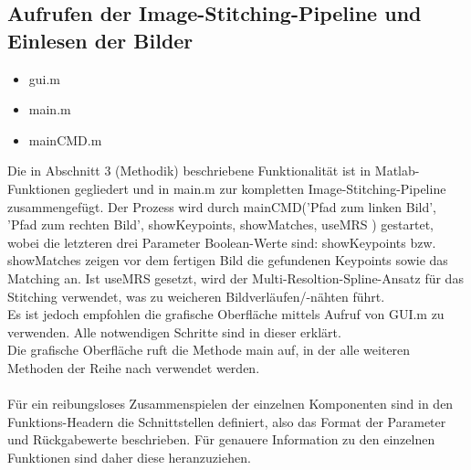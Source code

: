 \documentclass[deutsch]{scrartcl}
\begin{document}
\subsection{Aufrufen der Image-Stitching-Pipeline und Einlesen der Bilder}
\begin{itemize}
	\item gui.m 
	\item main.m 
	\item mainCMD.m
\end{itemize}
Die in Abschnitt 3 (Methodik) beschriebene Funktionalität ist in
Matlab-Funktionen gegliedert und in main.m zur kompletten
Image-Stitching-Pipeline zusammengefügt. Der Prozess wird durch mainCMD('Pfad
zum linken Bild', 'Pfad zum rechten Bild', showKeypoints, showMatches, useMRS ) gestartet, wobei die letzteren drei Parameter Boolean-Werte sind: showKeypoints bzw. showMatches zeigen vor dem fertigen Bild die gefundenen Keypoints sowie das Matching an. Ist useMRS gesetzt, wird der Multi-Resoltion-Spline-Ansatz für das Stitching verwendet, was zu weicheren Bildverläufen/-nähten führt. \\
Es ist jedoch empfohlen die grafische Oberfläche mittels Aufruf
von GUI.m zu verwenden. Alle notwendigen Schritte sind in dieser erklärt.\\
Die grafische Oberfläche ruft die Methode main auf, in der alle weiteren
Methoden der Reihe nach verwendet werden.\\\\
Für ein reibungsloses Zusammenspielen der einzelnen Komponenten sind in den Funktions-Headern die Schnittstellen definiert, also das Format der Parameter und Rückgabewerte beschrieben. Für genauere Information zu den einzelnen Funktionen sind daher diese heranzuziehen.
\end{document}
